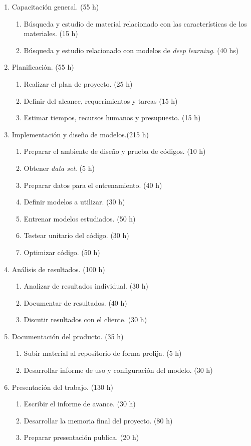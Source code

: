 \documentclass[
11pt, %
codirector, %
]{charter}
\begin{document}
\begin{enumerate}
\item Capacitación general. (55 h)
	\begin{enumerate}
	\item Búsqueda y estudio de material relacionado con las características
	de los materiales. (15 h)
	\item Búsqueda y estudio relacionado con modelos de \textit{deep learning}.
	(40 hs)
	\end{enumerate}
\item Planificación. (55 h)
	\begin{enumerate}
	\item Realizar el plan de proyecto. (25 h)
	\item Definir del alcance, requerimientos y tareas (15 h)
	\item Estimar tiempos, recursos humanos y presupuesto. (15 h)
	\end{enumerate}
\item Implementación y diseño de modelos.(215 h)
	\begin{enumerate}
	\item Preparar el ambiente de diseño y prueba de códigos. (10 h)
	\item Obtener \textit{data set}. (5 h)
	\item Preparar datos para el entrenamiento. (40 h)
	\item Definir modelos a utilizar. (30 h)
	\item Entrenar modelos estudiados. (50 h)
	\item Testear unitario del código. (30 h)
	\item Optimizar código. (50 h)
	\end{enumerate}
\item Análisis de resultados. (100 h)
	\begin{enumerate}
	\item Analizar de resultados individual. (30 h)
	\item Documentar de resultados. (40 h)
	\item Discutir resultados con el cliente. (30 h)
	\end{enumerate}
\item Documentación del producto. (35 h)
	\begin{enumerate}
		\item Subir material al repositorio de forma prolija. (5 h)
		\item Desarrollar informe de uso y configuración del modelo. (30 h)
	\end{enumerate}
\item Presentación del trabajo. (130 h)
	\begin{enumerate}
		\item Escribir el informe de avance. (30 h)
		\item Desarrollar la memoria final del proyecto. (80 h)
		\item Preparar presentación publica. (20 h)
	\end{enumerate}
\end{enumerate}
\end{document}
